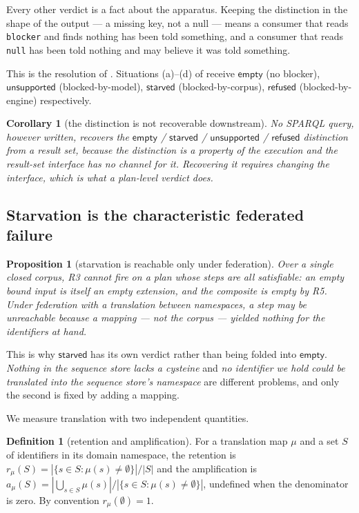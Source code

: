 \documentclass[11pt,a4paper]{article}
\theoremstyle{plain}
\newtheorem{proposition}[theorem]{Proposition}
\newtheorem{corollary}[theorem]{Corollary}
\theoremstyle{definition}
\newtheorem{definition}[theorem]{Definition}
\theoremstyle{remark}
\newcommand{\vempty}{\textsf{empty}}
\newcommand{\vsurf}{\textsf{unsupported}}
\newcommand{\vref}{\textsf{refused}}
\newcommand{\vstarve}{\textsf{starved}}
\newcommand{\bmdl}{\textsf{blocked-by-model}}
\newcommand{\bcorp}{\textsf{blocked-by-corpus}}
\newcommand{\beng}{\textsf{blocked-by-engine}}
\begin{document}
Every other verdict is a fact about the apparatus. Keeping the
distinction in the shape of the output --- a missing key, not a null
--- means a consumer that reads \texttt{blocker} and finds nothing has
been told something, and a consumer that reads \texttt{null} has been
told nothing and may believe it was told something.

This is the resolution of . Situations (a)--(d) of
 receive $\vempty$ (no blocker), $\vsurf$ (\bmdl),
$\vstarve$ (\bcorp), $\vref$ (\beng) respectively.

\begin{corollary}[the distinction is not recoverable downstream]
\label{cor:onebit}
No SPARQL query, however written, recovers the
$\vempty$ / $\vstarve$ / $\vsurf$ / $\vref$ distinction from a result
set, because the distinction is a property of the execution and the
result-set interface has no channel for it. Recovering it requires
changing the interface, which is what a plan-level verdict does.
\end{corollary}

\subsection{Starvation is the characteristic federated failure}

\begin{proposition}[starvation is reachable only under federation]
\label{prop:starve}
Over a single closed corpus, R3 cannot fire on a plan whose steps are
all satisfiable: an empty bound input is itself an empty extension, and
the composite is empty by R5. Under federation with a translation
between namespaces, a step may be unreachable because a \emph{mapping}
--- not the corpus --- yielded nothing for the identifiers at hand.
\end{proposition}

This is why $\vstarve$ has its own verdict rather than being folded into
$\vempty$. \emph{Nothing in the sequence store lacks a cysteine} and
\emph{no identifier we hold could be translated into the sequence
store's namespace} are different problems, and only the second is fixed
by adding a mapping.

We measure translation with two independent quantities.

\begin{definition}[retention and amplification]
\label{def:retamp}
For a translation map $\mu$ and a set $S$ of identifiers in its domain
namespace, the retention is $r_\mu(S) = |\{s \in S : \mu(s) \neq
\emptyset\}| / |S|$ and the amplification is $a_\mu(S) = |\bigcup_{s\in
S}\mu(s)| \big/ |\{s \in S : \mu(s) \neq \emptyset\}|$, undefined when
the denominator is zero. By convention $r_\mu(\emptyset) = 1$.
\end{definition}
\end{document}

